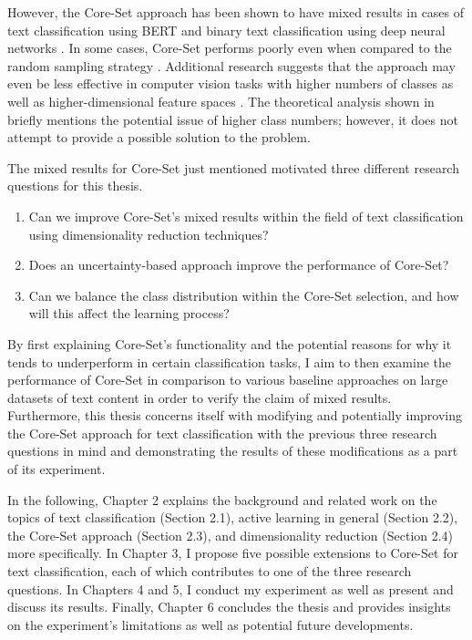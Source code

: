 \documentclass[english,bachelor,ul]{webisthesis} %
\begin{document}
However, the Core-Set approach has been shown to have mixed results in cases of text classification using BERT \citep{DBLP:conf/kdd/0002MM21, DBLP:conf/emnlp/Ein-DorHGSDCDAK20} and binary text classification using deep neural networks \citep{DBLP:conf/cikm/Liu0LZW21}. In some cases, Core-Set performs poorly even when compared to the random sampling strategy \citep{DBLP:conf/kdd/0002MM21, DBLP:conf/aaai/ColemanCKCBBNSZ22}. Additional research suggests that the approach may even be less effective in computer vision tasks with higher numbers of classes as well as higher-dimensional feature spaces \citep{DBLP:conf/iccv/SinhaED19}. The theoretical analysis shown in \cite{DBLP:conf/iclr/SenerS18} briefly mentions the potential issue of higher class numbers; however, it does not attempt to provide a possible solution to the problem.

The mixed results for Core-Set just mentioned motivated three different research questions for this thesis.

\begin{enumerate}
    \item Can we improve Core-Set's mixed results within the field of text classification using dimensionality reduction techniques?
    \item Does an uncertainty-based approach improve the performance of Core-Set?
    \item Can we balance the class distribution within the Core-Set selection, and how will this affect the learning process?
\end{enumerate}

By first explaining Core-Set's functionality and the potential reasons for why it tends to underperform in certain classification tasks, I aim to then examine the performance of Core-Set in comparison to various baseline approaches on large datasets of text content in order to verify the claim of mixed results. Furthermore, this thesis concerns itself with modifying and potentially improving the Core-Set approach for text classification with the previous three research questions in mind and demonstrating the results of these modifications as a part of its experiment.

In the following, Chapter 2 explains the background and related work on the topics of text classification (Section 2.1), active learning in general (Section 2.2), the Core-Set approach (Section 2.3), and dimensionality reduction (Section 2.4) more specifically. In Chapter 3, I propose five possible extensions to Core-Set for text classification, each of which contributes to one of the three research questions. In Chapters 4 and 5, I conduct my experiment as well as present and discuss its results. Finally, Chapter 6 concludes the thesis and provides insights on the experiment's limitations as well as potential future developments. 
\end{document}
